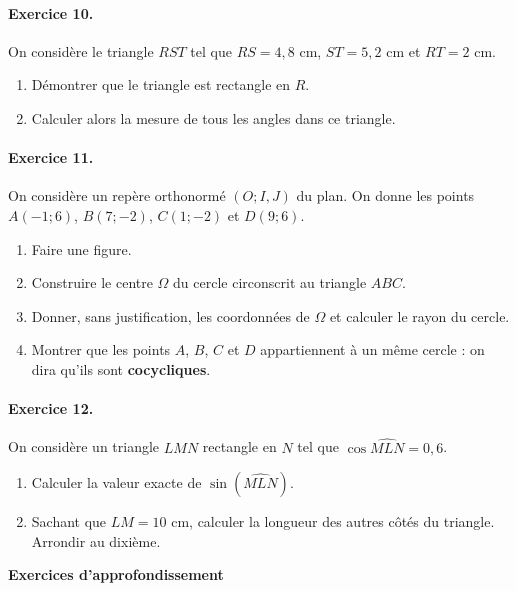 \documentclass[11pt]{article}
\begin{document}
\paragraph{Exercice 10.} On considère le triangle $RST$ tel que $RS=4,8$ cm,
$ST=5,2$ cm et $RT=2$ cm.
\begin{enumerate}
  \item Démontrer que le triangle est rectangle en $R$.
  \item Calculer alors la mesure de tous les angles dans ce triangle.
\end{enumerate}

\paragraph{Exercice 11.} On considère un repère orthonormé $(O; I, J)$ du plan.
On donne les points $A(-1; 6)$, $B(7; -2)$, $C(1; -2)$ et $D(9; 6)$.
\begin{enumerate}
  \item Faire une figure.
  \item Construire le centre $\Omega$ du cercle circonscrit au triangle $ABC$.
  \item Donner, sans justification, les coordonnées de $\Omega$ et calculer le
    rayon du cercle.
  \item Montrer que les points $A$, $B$, $C$ et $D$ appartiennent à un même
    cercle : on dira qu'ils sont \textbf{cocycliques}.
\end{enumerate}

\paragraph{Exercice 12.} On considère un triangle $LMN$ rectangle en $N$ tel que
$\cos\widehat{MLN}=0,6$.
\begin{enumerate}
  \item Calculer la valeur exacte de $\sin(\widehat{MLN})$.
  \item Sachant que $LM=10$ cm, calculer la longueur des autres côtés du
    triangle. Arrondir au dixième.
\end{enumerate}

\newpage
\begin{center}
  \LARGE
  \textbf{Exercices d'approfondissement}
\end{center}
\end{document}
